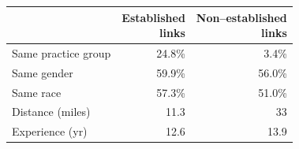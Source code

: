 
\begin{tabular}{lrr}
\toprule
  & \shortstack[r]{Established \\ links} & \shortstack[r]{Non--established \\ links}\\
\midrule
Same practice group & 24.8\% & 3.4\%\\
Same gender & 59.9\% & 56.0\%\\
Same race & 57.3\% & 51.0\%\\
Distance (miles) & 11.3 & 33\\
Experience (yr) & 12.6 & 13.9\\
\bottomrule
\end{tabular}
